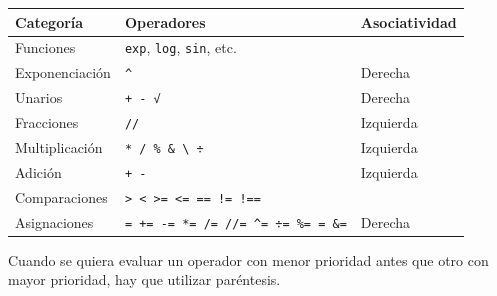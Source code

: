 \documentclass[
  a4paper,
]{scrreport}
\theoremstyle{definition}
\theoremstyle{remark}
\begin{document}
\begin{longtable}[]{@{}
  >{\raggedright\arraybackslash}p{}
  >{\raggedright\arraybackslash}p{}
  >{\raggedright\arraybackslash}p{}@{}}
\toprule\noalign{}
\begin{minipage}[b]{\linewidth}\raggedright
Categoría
\end{minipage} & \begin{minipage}[b]{\linewidth}\raggedright
Operadores
\end{minipage} & \begin{minipage}[b]{\linewidth}\raggedright
Asociatividad
\end{minipage} \\
\midrule\noalign{}
\endhead
\bottomrule\noalign{}
\endlastfoot
Funciones & \texttt{exp}, \texttt{log}, \texttt{sin}, etc. & \\
Exponenciación & \texttt{\^{}} & Derecha \\
Unarios & \texttt{+\ -\ √} & Derecha \\
Fracciones & \texttt{//} & Izquierda \\
Multiplicación & \texttt{*\ /\ \%\ \&\ \textbackslash{}\ ÷} &
Izquierda \\
Adición & \texttt{+\ -\ \textbar{}} & Izquierda \\
Comparaciones &
\texttt{\textgreater{}\ \textless{}\ \textgreater{}=\ \textless{}=\ ==\ !=\ !==}
& \\
Asignaciones &
\texttt{=\ +=\ -=\ *=\ /=\ //=\ \^{}=\ ÷=\ \%=\ \textbar{}=\ \&=} &
Derecha \\
\end{longtable}

Cuando se quiera evaluar un operador con menor prioridad antes que otro
con mayor prioridad, hay que utilizar paréntesis.
\end{document}
